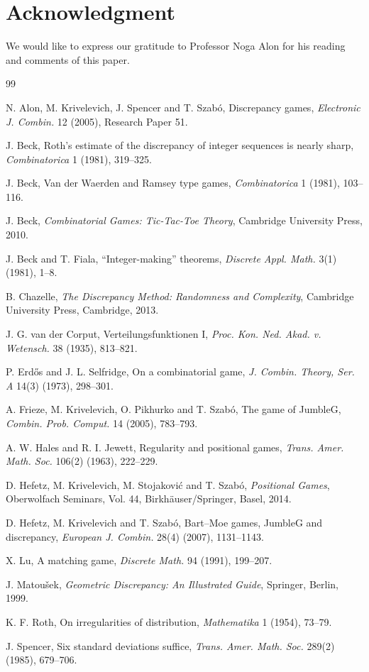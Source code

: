 \documentclass[twoside,12pt]{article}
\numberwithin{equation}{section}
\begin{document}
\section*{Acknowledgment}

We would like to express our gratitude to Professor Noga Alon for his reading and comments of this paper. 

\begin{thebibliography}{99}

N. Alon, M. Krivelevich, J. Spencer and T. Szab\'o,
 Discrepancy games,
 \emph{Electronic J. Combin.} 12 (2005), Research Paper 51.

J. Beck,
 Roth's estimate of the discrepancy of integer sequences is nearly sharp,
 \emph{Combinatorica} 1 (1981), 319--325.


J. Beck,
 Van der Waerden and Ramsey type games,
 \emph{Combinatorica} 1 (1981), 103--116.

J. Beck,
 \emph{Combinatorial Games: Tic-Tac-Toe Theory},
 Cambridge University Press, 2010.

J. Beck and T. Fiala,
 ``Integer-making'' theorems,
 \emph{Discrete Appl. Math.} 3(1)(1981), 1--8.

B. Chazelle,
 \emph{The Discrepancy Method: Randomness and Complexity},
 Cambridge University Press, Cambridge, 2013.

J. G. van der Corput,
Verteilungsfunktionen I,
\emph{Proc. Kon. Ned. Akad. v. Wetensch.} 38 (1935), 813--821.

P. Erd\H{o}s and J. L. Selfridge,
 On a combinatorial game,
 \emph{J. Combin. Theory, Ser. A} 14(3) (1973), 298--301.

A. Frieze, M. Krivelevich, O. Pikhurko and T. Szab\'o,
 The game of JumbleG,
 \emph{Combin. Prob. Comput.} 14 (2005), 783--793.

A. W. Hales and R. I. Jewett,
 Regularity and positional games,
 \emph{Trans. Amer. Math. Soc.} 106(2) (1963), 222--229.

D. Hefetz, M. Krivelevich, M. Stojakovi\'c and T. Szab\'o,
 \emph{Positional Games},
 Oberwolfach Seminars, Vol. 44, Birkh\"auser/Springer, Basel, 2014.


D. Hefetz, M. Krivelevich and T. Szab\'o,
 Bart--Moe games, JumbleG and discrepancy,
 \emph{European J. Combin.} 28(4) (2007), 1131--1143.

X. Lu,
 A matching game,
 \emph{Discrete Math.} 94 (1991), 199--207.

J. Matou\v{s}ek,
 \emph{Geometric Discrepancy: An Illustrated Guide},
 Springer, Berlin, 1999.

K. F. Roth,
 On irregularities of distribution,
 \emph{Mathematika} 1 (1954), 73--79.

J. Spencer,
 Six standard deviations suffice,
 \emph{Trans. Amer. Math. Soc.} 289(2) (1985), 679--706.

\end{thebibliography}
\end{document}
